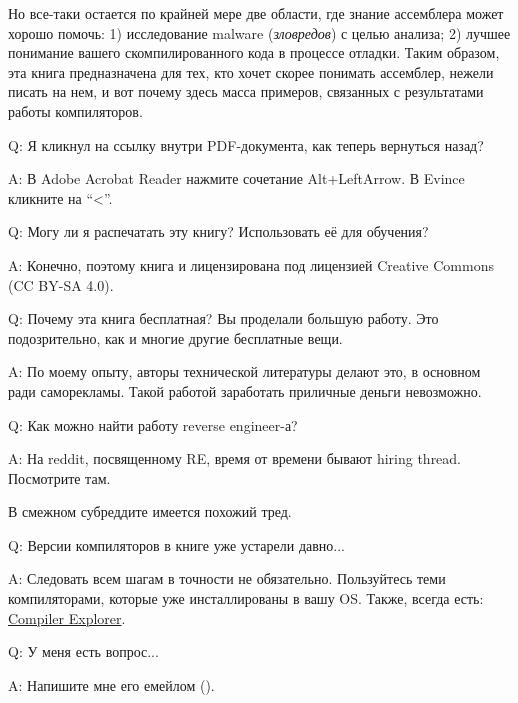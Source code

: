 Но все-таки остается по крайней мере две области, где знание ассемблера может хорошо помочь:
1) исследование malware (\emph{зловредов}) с целью анализа; 2) лучшее понимание
вашего скомпилированного кода в процессе отладки.
Таким образом, эта книга предназначена для тех, кто хочет скорее понимать ассемблер,
нежели писать на нем, и вот почему здесь масса примеров, связанных с результатами
работы компиляторов.

\par Q: Я кликнул на ссылку внутри PDF-документа, как теперь вернуться назад?
\par A: В Adobe Acrobat Reader нажмите сочетание Alt+LeftArrow. В Evince кликните на ``<''.

\par Q: Могу ли я распечатать эту книгу? Использовать её для обучения?
\par A: Конечно, поэтому книга и лицензирована под лицензией Creative Commons (CC BY-SA 4.0).

\par Q: Почему эта книга бесплатная? Вы проделали большую работу. Это подозрительно, как и многие другие бесплатные вещи.
\par A: По моему опыту, авторы технической литературы делают это, в основном ради саморекламы.
Такой работой заработать приличные деньги невозможно.

\par Q: Как можно найти работу reverse engineer-а?
\par A: На reddit, посвященному RE\FNURLREDDIT, время от времени бывают hiring thread.
Посмотрите там.

В смежном субреддите  имеется похожий тред.

\par Q: Версии компиляторов в книге уже устарели давно...
\par A: Следовать всем шагам в точности не обязательно.
Пользуйтесь теми компиляторами, которые уже инсталлированы в вашу \ac{OS}.
Также, всегда есть: \href{https://godbolt.org/}{Compiler Explorer}.

\par Q: У меня есть вопрос...
\par A: Напишите мне его емейлом (\EMAILS).
